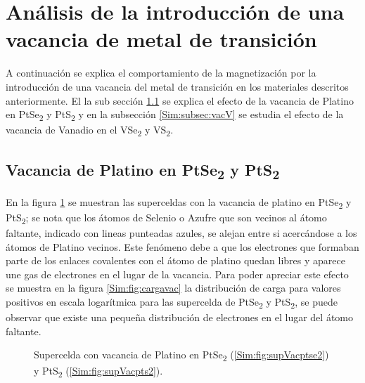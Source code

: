 \section{An\'alisis de la introducci\'on de una vacancia de metal de transición } \label{Sim:sec:MdefVac}
A continuaci\'on se explica el comportamiento de la magnetizaci\'on por la introducci\'on de una vacancia del metal de transición en los materiales descritos anteriormente. El la sub secci\'on \ref{Sim:subsec:vacPt} se explica el efecto de la vacancia de Platino en PtSe\textsubscript{2} y PtS\textsubscript{2} y en la subsecci\'on \ref{Sim:subsec:vacV} se estudia el efecto de la vacancia de Vanadio en el VSe\textsubscript{2} y VS\textsubscript{2}.
\subsection{Vacancia de Platino en PtSe\textsubscript{2} y PtS\textsubscript{2}} \label{Sim:subsec:vacPt}
En la figura \ref{Sim:fig:supVac} se muestran las superceldas con la vacancia de platino en PtSe\textsubscript{2} y PtS\textsubscript{2}; se nota que los \'atomos de Selenio o Azufre que son vecinos al \'atomo faltante, indicado con lineas punteadas azules, se alejan entre si acerc\'andose a los \'atomos de Platino  vecinos. Este fen\'omeno debe a que los electrones que formaban parte de los enlaces covalentes con el \'atomo de platino quedan libres y aparece une gas de electrones en el lugar de la  vacancia. Para poder apreciar este efecto se muestra en la figura \ref{Sim:fig:cargavac}  la distribuci\'on de carga para valores positivos en escala logar\'itmica para las supercelda de PtSe\textsubscript{2} y  PtS\textsubscript{2}, se puede observar que existe una peque\~na distribuci\'on de electrones en el lugar del \'atomo faltante.

\begin{figure}[!hbt]
	\centering
    \caption[Superceldas de  PtSe\textsubscript{2} y PtS\textsubscript{2} con vacancia de Platino.]{Supercelda con vacancia de Platino en PtSe\textsubscript{2} (\ref{Sim:fig:supVacptse2}) y PtS\textsubscript{2} (\ref{Sim:fig:supVacpts2}).}
    \label{Sim:fig:supVac}
\end{figure}

